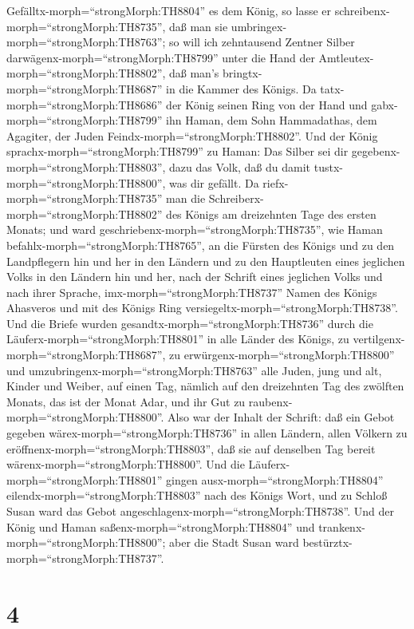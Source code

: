 Gefälltx-morph=``strongMorph:TH8804'' es dem König, so lasse er
schreibenx-morph=``strongMorph:TH8735'', daß man sie
umbringex-morph=``strongMorph:TH8763''; so will ich zehntausend Zentner
Silber darwägenx-morph=``strongMorph:TH8799'' unter die Hand der
Amtleutex-morph=``strongMorph:TH8802'', daß man's
bringtx-morph=``strongMorph:TH8687'' in die Kammer des Königs.
 Da tatx-morph=``strongMorph:TH8686'' der König seinen Ring
von der Hand und gabx-morph=``strongMorph:TH8799'' ihn Haman, dem Sohn
Hammadathas, dem Agagiter, der Juden
Feindx-morph=``strongMorph:TH8802''.  Und der König
sprachx-morph=``strongMorph:TH8799'' zu Haman: Das Silber sei dir
gegebenx-morph=``strongMorph:TH8803'', dazu das Volk, daß du damit
tustx-morph=``strongMorph:TH8800'', was dir gefällt.  Da
riefx-morph=``strongMorph:TH8735'' man die
Schreiberx-morph=``strongMorph:TH8802'' des Königs am dreizehnten Tage
des ersten Monats; und ward geschriebenx-morph=``strongMorph:TH8735'',
wie Haman befahlx-morph=``strongMorph:TH8765'', an die Fürsten des
Königs und zu den Landpflegern hin und her in den Ländern und zu den
Hauptleuten eines jeglichen Volks in den Ländern hin und her, nach der
Schrift eines jeglichen Volks und nach ihrer Sprache,
imx-morph=``strongMorph:TH8737'' Namen des Königs Ahasveros und mit des
Königs Ring versiegeltx-morph=``strongMorph:TH8738''.  Und
die Briefe wurden gesandtx-morph=``strongMorph:TH8736'' durch die
Läuferx-morph=``strongMorph:TH8801'' in alle Länder des Königs, zu
vertilgenx-morph=``strongMorph:TH8687'', zu
erwürgenx-morph=``strongMorph:TH8800'' und
umzubringenx-morph=``strongMorph:TH8763'' alle Juden, jung und alt,
Kinder und Weiber, auf einen Tag, nämlich auf den dreizehnten Tag des
zwölften Monats, das ist der Monat Adar, und ihr Gut zu
raubenx-morph=``strongMorph:TH8800''.  Also war der Inhalt
der Schrift: daß ein Gebot gegeben wärex-morph=``strongMorph:TH8736'' in
allen Ländern, allen Völkern zu eröffnenx-morph=``strongMorph:TH8803'',
daß sie auf denselben Tag bereit wärenx-morph=``strongMorph:TH8800''.
 Und die Läuferx-morph=``strongMorph:TH8801'' gingen
ausx-morph=``strongMorph:TH8804'' eilendx-morph=``strongMorph:TH8803''
nach des Königs Wort, und zu Schloß Susan ward das Gebot
angeschlagenx-morph=``strongMorph:TH8738''. Und der König und Haman
saßenx-morph=``strongMorph:TH8804'' und
trankenx-morph=``strongMorph:TH8800''; aber die Stadt Susan ward
bestürztx-morph=``strongMorph:TH8737''.

\hypertarget{section-3}{%
\section{4}\label{section-3}}


